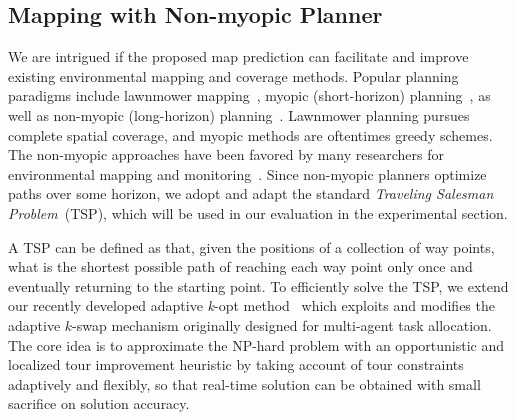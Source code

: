 \subsection{Mapping with Non-myopic Planner}
\label{sect:plan}

We are intrigued if the proposed map prediction can facilitate and improve existing environmental mapping and coverage methods. Popular planning paradigms include lawnmower mapping~\cite{li2019coverage, song2018varepsilon}, myopic (short-horizon) planning~\cite{khan2014greedy}, as well as non-myopic (long-horizon) planning~\cite{ kantaros2019asymptotically}. Lawnmower planning pursues complete spatial coverage, and myopic methods are oftentimes greedy schemes. The non-myopic approaches have been favored by many researchers for environmental mapping and monitoring~\cite{ma2016information, chen2019pareto}. Since non-myopic planners optimize paths over some horizon, we adopt and adapt the standard  \textit{Traveling Salesman Problem}~(TSP), which will be used in our evaluation in the experimental section. 

A TSP %
can be defined as that, given the positions of a collection of way points, what is the shortest possible path of reaching each way point only once and eventually returning to the starting point. 
To efficiently solve the TSP, we extend our recently developed adaptive \textit{k}-opt method~\cite{ma2016adaptive} which exploits and modifies the adaptive $k$-swap mechanism originally designed for multi-agent
task allocation. The core idea is to approximate the NP-hard problem with an opportunistic and localized tour improvement heuristic by taking account of tour
constraints adaptively and flexibly, so that real-time solution can be obtained with small sacrifice on solution accuracy. 

